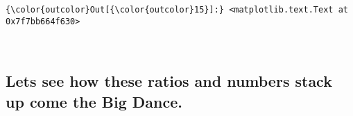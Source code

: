 \documentclass[11pt]{article}
\begin{document}
\begin{Verbatim}[commandchars=\\\{\}]
{\color{outcolor}Out[{\color{outcolor}15}]:} <matplotlib.text.Text at 0x7f7bb664f630>
\end{Verbatim}
            
    \begin{center}
    \end{center}
    { \hspace*{\fill} \\}
    
    \hypertarget{lets-see-how-these-ratios-and-numbers-stack-up-come-the-big-dance.}{%
\subsection{Lets see how these ratios and numbers stack up come the Big
Dance.}\label{lets-see-how-these-ratios-and-numbers-stack-up-come-the-big-dance.}}
\end{document}
